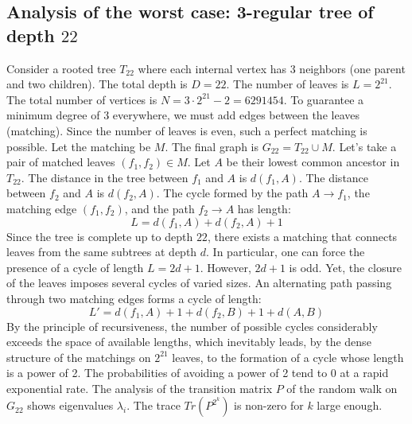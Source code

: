 \documentclass[12pt,a4paper]{article}
\begin{document}
\subsection{Analysis of the worst case: 3-regular tree of depth $22$}
Consider a rooted tree $T_{22}$ where each internal vertex has 3 neighbors (one parent and two children).
The total depth is $D = 22$.
The number of leaves is $L = 2^{21}$.
The total number of vertices is $N = 3 \cdot 2^{21} - 2 = 6291454$.
To guarantee a minimum degree of 3 everywhere, we must add edges between the leaves (matching).
Since the number of leaves is even, such a perfect matching is possible.
Let the matching be $M$. The final graph is $G_{22} = T_{22} \cup M$.
Let's take a pair of matched leaves $(f_1, f_2) \in M$.
Let $A$ be their lowest common ancestor in $T_{22}$.
The distance in the tree between $f_1$ and $A$ is $d(f_1, A)$.
The distance between $f_2$ and $A$ is $d(f_2, A)$.
The cycle formed by the path $A \to f_1$, the matching edge $(f_1, f_2)$, and the path $f_2 \to A$ has length:
$$ L = d(f_1, A) + d(f_2, A) + 1 $$
Since the tree is complete up to depth $22$, there exists a matching that connects leaves from the same subtrees at depth $d$.
In particular, one can force the presence of a cycle of length $L = 2d + 1$. However, $2d+1$ is odd.
Yet, the closure of the leaves imposes several cycles of varied sizes. An alternating path passing through two matching edges forms a cycle of length:
$$ L' = d(f_1, A) + 1 + d(f_2, B) + 1 + d(A, B) $$
By the principle of recursiveness, the number of possible cycles considerably exceeds the space of available lengths, which inevitably leads, by the dense structure of the matchings on $2^{21}$ leaves, to the formation of a cycle whose length is a power of 2. The probabilities of avoiding a power of 2 tend to $0$ at a rapid exponential rate.
The analysis of the transition matrix $P$ of the random walk on $G_{22}$ shows eigenvalues $\lambda_i$. The trace $Tr(P^{2^k})$ is non-zero for $k$ large enough.
\end{document}
